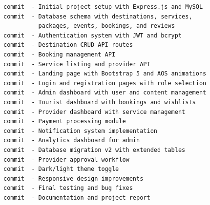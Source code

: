 
\begin{verbatim}
commit  - Initial project setup with Express.js and MySQL
commit  - Database schema with destinations, services,
          packages, events, bookings, and reviews
commit  - Authentication system with JWT and bcrypt
commit  - Destination CRUD API routes
commit  - Booking management API
commit  - Service listing and provider API
commit  - Landing page with Bootstrap 5 and AOS animations
commit  - Login and registration pages with role selection
commit  - Admin dashboard with user and content management
commit  - Tourist dashboard with bookings and wishlists
commit  - Provider dashboard with service management
commit  - Payment processing module
commit  - Notification system implementation
commit  - Analytics dashboard for admin
commit  - Database migration v2 with extended tables
commit  - Provider approval workflow
commit  - Dark/light theme toggle
commit  - Responsive design improvements
commit  - Final testing and bug fixes
commit  - Documentation and project report
\end{verbatim}

